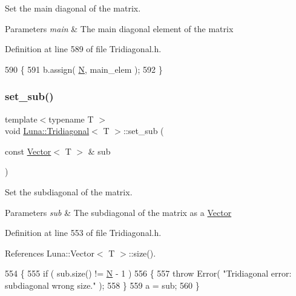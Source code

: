 Set the main diagonal of the matrix. 


\begin{DoxyParams}{Parameters}
{\em main} & The main diagonal element of the matrix \\
\hline
\end{DoxyParams}


Definition at line 589 of file Tridiagonal.\+h.


\begin{DoxyCode}
590   \{
591     b.assign( \hyperlink{namespaceHeat__plot_a7d050092798e28458a263710837bda77}{N}, main\_elem );
592   \}
\end{DoxyCode}
\mbox{\label{classLuna_1_1Tridiagonal_a6d131d4c600e591c49e7825b52a1021c}} 
\subsubsection{\texorpdfstring{set\+\_\+sub()}{set\_sub()}\hspace{0.1cm}{\footnotesize\ttfamily [1/2]}}
{\footnotesize\ttfamily template$<$typename T $>$ \\
void \hyperlink{classLuna_1_1Tridiagonal}{Luna\+::\+Tridiagonal}$<$ T $>$\+::set\+\_\+sub (\begin{DoxyParamCaption}\item[{const \hyperlink{classLuna_1_1Vector}{Vector}$<$ T $>$ \&}]{sub }\end{DoxyParamCaption})\hspace{0.3cm}{\ttfamily [inline]}}



Set the subdiagonal of the matrix. 


\begin{DoxyParams}{Parameters}
{\em sub} & The subdiagonal of the matrix as a \hyperlink{classLuna_1_1Vector}{Vector} \\
\hline
\end{DoxyParams}


Definition at line 553 of file Tridiagonal.\+h.



References Luna\+::\+Vector$<$ T $>$\+::size().


\begin{DoxyCode}
554   \{
555     \textcolor{keywordflow}{if} ( sub.size() != \hyperlink{namespaceHeat__plot_a7d050092798e28458a263710837bda77}{N} - 1 )
556     \{
557       \textcolor{keywordflow}{throw} Error( \textcolor{stringliteral}{"Tridiagonal error: subdiagonal wrong size."} );
558     \}
559     a = sub;
560   \}
\end{DoxyCode}
\mbox{\label{classLuna_1_1Tridiagonal_a288b97194054318128a096aac12a7eef}} 
